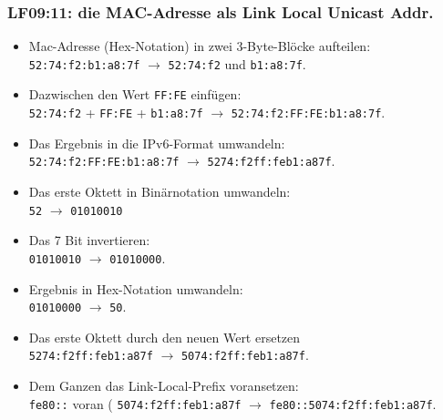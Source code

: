 \begin{frame}
  \frametitle{LF09:11: die MAC-Adresse als Link Local Unicast Addr.}

  \begin{footnotesize}

  \begin{itemize}
    \item Mac-Adresse (Hex-Notation) in zwei 3-Byte-Blöcke aufteilen:\\
    \qquad \texttt{52:74:f2:b1:a8:7f} $\rightarrow$ \texttt{52:74:f2} und \texttt{b1:a8:7f}.
    \item Dazwischen den Wert \texttt{FF:FE} einfügen: \\
    \qquad \texttt{52:74:f2} + \texttt{FF:FE} + \texttt{b1:a8:7f} $\rightarrow$ \texttt{52:74:f2:FF:FE:b1:a8:7f}.
    \item Das Ergebnis in die IPv6-Format umwandeln: \\
    \qquad \texttt{52:74:f2:FF:FE:b1:a8:7f} $\rightarrow$ \texttt{5274:f2ff:feb1:a87f}.
    \item Das erste Oktett in Binärnotation umwandeln: \\
    \qquad \texttt{52} $\rightarrow$ \texttt{01010010}
    \item Das 7 Bit invertieren: \\
    \qquad \texttt{01010010} $\rightarrow$ \texttt{01010000}.
    \item Ergebnis in Hex-Notation umwandeln:\\ 
    \qquad \texttt{01010000} $\rightarrow$ \texttt{50}.
    \item Das erste Oktett durch den neuen Wert ersetzen \\
    \qquad \texttt{5274:f2ff:feb1:a87f} $\rightarrow$ \texttt{5074:f2ff:feb1:a87f}.
    \item Dem Ganzen das Link-Local-Prefix voransetzen: \\
    \qquad \texttt{fe80::} voran ( \texttt{5074:f2ff:feb1:a87f} $\rightarrow$ \texttt{fe80::5074:f2ff:feb1:a87f}.
  \end{itemize}


\end{footnotesize}

\end{frame}


